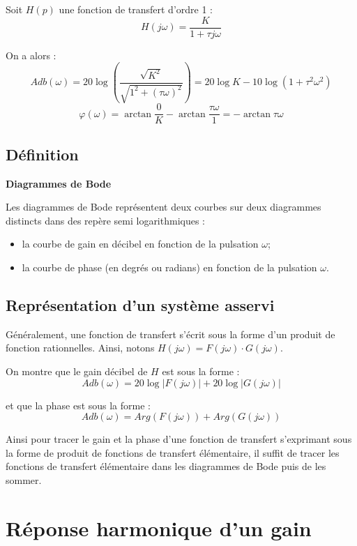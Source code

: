 \documentclass[10pt,oneside]{article}
\begin{document}
\begin{exemple}
Soit $H(p)$ une fonction de transfert d'ordre 1 :
$$
H(j\omega)= \dfrac{K}{1+\tau j\omega }
$$

On a alors : 
$$
Adb(\omega) = 20 \log \left(\dfrac{\sqrt{K^2}}{\sqrt{1^2+(\tau\omega)^2}}\right) = 20 \log K - 10 \log \left(1+\tau^2\omega^2 \right)
$$
$$
\varphi(\omega)= \arctan \dfrac{0}{K}-\arctan \dfrac{\tau\omega}{1} = - \arctan \tau\omega
$$

\end{exemple}

\subsection{Définition}

\begin{defi}
\textbf{Diagrammes de Bode}

Les diagrammes de Bode représentent deux courbes sur deux diagrammes distincts dans des repère semi logarithmiques :
\begin{itemize}
\item la courbe de gain en décibel en fonction de la pulsation $\omega$;
\item la courbe de phase (en degrés ou radians) en fonction de la pulsation $\omega$.
\end{itemize}

\end{defi}


\subsection{Représentation d'un système asservi}

Généralement, une fonction de transfert s'écrit sous la forme d'un produit de fonction rationnelles. Ainsi, notons $H(j\omega)=F(j\omega) \cdot G(j\omega)$. 

On montre que le gain décibel de $H$ est sous la forme :
$$
Adb(\omega) = 20 \log |F(j\omega) |+20 \log |G(j\omega) |
$$

et que la phase est sous la forme :
$$
Adb(\omega) = Arg \left(F(j\omega) \right)+Arg \left(G(j\omega) \right)
$$

Ainsi pour tracer le gain et la phase d'une fonction de transfert s'exprimant sous la forme de produit de fonctions de transfert élémentaire, il suffit de tracer les fonctions de transfert élémentaire dans les diagrammes de Bode puis de les sommer.

\section{Réponse harmonique d'un gain}
\end{document}
